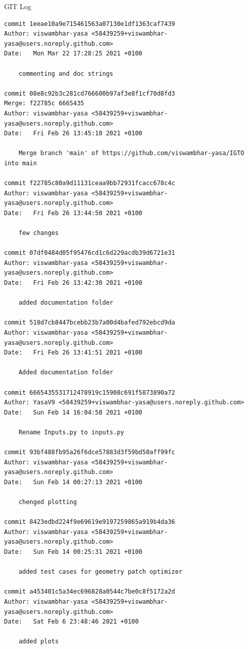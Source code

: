 \documentclass[a4paper,12pt,times]{article}
\begin{document}
\begin{section}{GIT Log}
\begin{verbatim}
commit 1eeae10a9e715461563a07130e1df1363caf7439
Author: viswambhar-yasa <58439259+viswambhar-yasa@users.noreply.github.com>
Date:   Mon Mar 22 17:28:25 2021 +0100

    commenting and doc strings

commit 08e8c92b3c281cd766600b97af3e8f1cf70d8fd3
Merge: f22785c 6665435
Author: viswambhar-yasa <58439259+viswambhar-yasa@users.noreply.github.com>
Date:   Fri Feb 26 13:45:10 2021 +0100

    Merge branch 'main' of https://github.com/viswambhar-yasa/IGTO into main

commit f22785c80a9d11131ceaa9bb72931fcacc678c4c
Author: viswambhar-yasa <58439259+viswambhar-yasa@users.noreply.github.com>
Date:   Fri Feb 26 13:44:50 2021 +0100

    few changes

commit 07df0484d05f95476cd1c6d229acdb39d6721e31
Author: viswambhar-yasa <58439259+viswambhar-yasa@users.noreply.github.com>
Date:   Fri Feb 26 13:42:30 2021 +0100

    added documentation folder

commit 518d7cb8447bcebb23b7a00d4bafed792ebcd9da
Author: viswambhar-yasa <58439259+viswambhar-yasa@users.noreply.github.com>
Date:   Fri Feb 26 13:41:51 2021 +0100

    Added documentation folder

commit 6665435531712478919c15908c691f5873890a72
Author: YasaV9 <58439259+viswambhar-yasa@users.noreply.github.com>
Date:   Sun Feb 14 16:04:58 2021 +0100

    Rename Inputs.py to inputs.py

commit 93bf488fb95a26f6dce57883d3f59bd50aff99fc
Author: viswambhar-yasa <58439259+viswambhar-yasa@users.noreply.github.com>
Date:   Sun Feb 14 00:27:13 2021 +0100

    chenged plotting

commit 8423edbd224f9e69619e9197259865a919b4da36
Author: viswambhar-yasa <58439259+viswambhar-yasa@users.noreply.github.com>
Date:   Sun Feb 14 00:25:31 2021 +0100

    added test cases for geometry patch optimizer

commit a453401c5a34ec696828a0544c7be0c8f5172a2d
Author: viswambhar-yasa <58439259+viswambhar-yasa@users.noreply.github.com>
Date:   Sat Feb 6 23:48:46 2021 +0100

    added plots


\end{verbatim}
\end{section}
\end{document}
